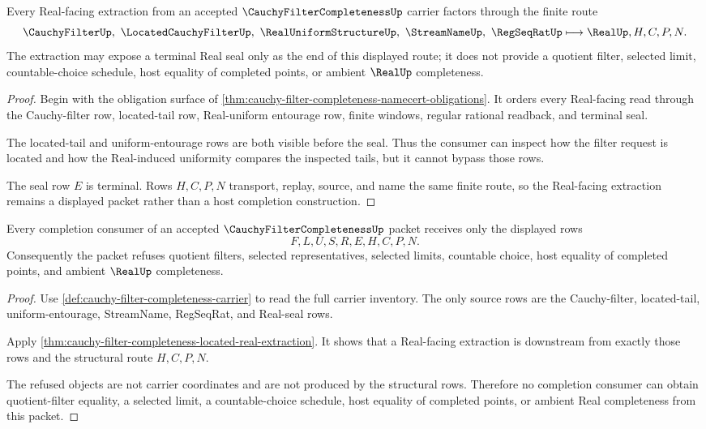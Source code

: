 \begin{theorem}
\label{thm:cauchy-filter-completeness-located-real-extraction}
Every Real-facing extraction from an accepted $\CauchyFilterCompletenessUp$ carrier factors through the finite route
$$
\CauchyFilterUp,\ \LocatedCauchyFilterUp,\ \RealUniformStructureUp,\ \StreamNameUp,\ \RegSeqRatUp
\longmapsto
\RealUp,H,C,P,N .
$$
The extraction may expose a terminal Real seal only as the end of this displayed route; it does not provide a quotient filter, selected limit, countable-choice schedule, host equality of completed points, or ambient $\RealUp$ completeness.
\end{theorem}
\begin{proof}
Begin with the obligation surface of \autoref{thm:cauchy-filter-completeness-namecert-obligations}. It orders every Real-facing read through the Cauchy-filter row, located-tail row, Real-uniform entourage row, finite windows, regular rational readback, and terminal seal.

The located-tail and uniform-entourage rows are both visible before the seal. Thus the consumer can inspect how the filter request is located and how the Real-induced uniformity compares the inspected tails, but it cannot bypass those rows.

The seal row $E$ is terminal. Rows $H,C,P,N$ transport, replay, source, and name the same finite route, so the Real-facing extraction remains a displayed packet rather than a host completion construction.
\end{proof}

\begin{theorem}
\label{thm:cauchy-filter-completeness-nonescape}
Every completion consumer of an accepted $\CauchyFilterCompletenessUp$ packet receives only the displayed rows
$$
F,L,U,S,R,E,H,C,P,N .
$$
Consequently the packet refuses quotient filters, selected representatives, selected limits, countable choice, host equality of completed points, and ambient $\RealUp$ completeness.
\end{theorem}
\begin{proof}
Use \autoref{def:cauchy-filter-completeness-carrier} to read the full carrier inventory. The only source rows are the Cauchy-filter, located-tail, uniform-entourage, StreamName, RegSeqRat, and Real-seal rows.

Apply \autoref{thm:cauchy-filter-completeness-located-real-extraction}. It shows that a Real-facing extraction is downstream from exactly those rows and the structural route $H,C,P,N$.

The refused objects are not carrier coordinates and are not produced by the structural rows. Therefore no completion consumer can obtain quotient-filter equality, a selected limit, a countable-choice schedule, host equality of completed points, or ambient Real completeness from this packet.
\end{proof}

